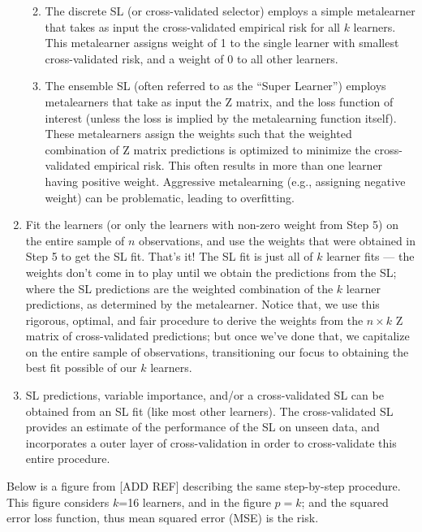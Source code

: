 \documentclass[12pt, krantz2,]{book}
\providecommand{\tightlist}{%
  \setlength{\itemsep}{0pt}\setlength{\parskip}{0pt}}
\theoremstyle{definition}
\theoremstyle{definition}
\theoremstyle{definition}
\newcommand{\1}{\mathbbm{1}}
\begin{document}
\begin{enumerate}
  \begin{enumerate}
  \def\labelenumii{\alph{enumii}.}
  \tightlist
  \item
    The discrete SL (or cross-validated selector) employs a simple
    metalearner that takes as input the cross-validated empirical risk
    for all \(k\) learners. This metalearner assigns weight of 1 to the
    single learner with smallest cross-validated risk, and a weight of 0 to
    all other learners.
  \item
    The ensemble SL (often referred to as the ``Super Learner'') employs
    metalearners that take as input the Z matrix, and the loss function of
    interest (unless the loss is implied by the metalearning function
    itself). These metalearners assign the weights such that the weighted
    combination of Z matrix predictions is optimized to minimize
    the cross-validated empirical risk. This often results in more than one
    learner having positive weight. Aggressive metalearning (e.g.,
    assigning negative weight) can be problematic, leading to overfitting.
  \end{enumerate}
\item
  Fit the learners (or only the learners with non-zero weight from Step 5)
  on the entire sample of \(n\) observations, and use the weights that were
  obtained in Step 5 to get the SL fit. That's it! The SL fit is just all of
  \(k\) learner fits --- the weights don't come in to play until we obtain the
  predictions from the SL; where the SL predictions are the weighted
  combination of the \(k\) learner predictions, as determined by the
  metalearner. Notice that, we use this rigorous, optimal, and fair
  procedure to derive the weights from the \(n \times k\) Z matrix of
  cross-validated predictions; but once we've done that, we capitalize on the
  entire sample of observations, transitioning our focus to obtaining the
  best fit possible of our \(k\) learners.
\item
  SL predictions, variable importance, and/or a cross-validated SL can be
  obtained from an SL fit (like most other learners). The cross-validated SL
  provides an estimate of the performance of the SL on unseen data, and
  incorporates a outer layer of cross-validation in order to cross-validate
  this entire procedure.
\end{enumerate}

Below is a figure from {[}ADD REF{]} describing the same step-by-step procedure.
This figure considers \(k\)=16 learners, and in the figure \(p=k\); and the squared
error loss function, thus mean squared error (MSE) is the risk.
\end{document}
